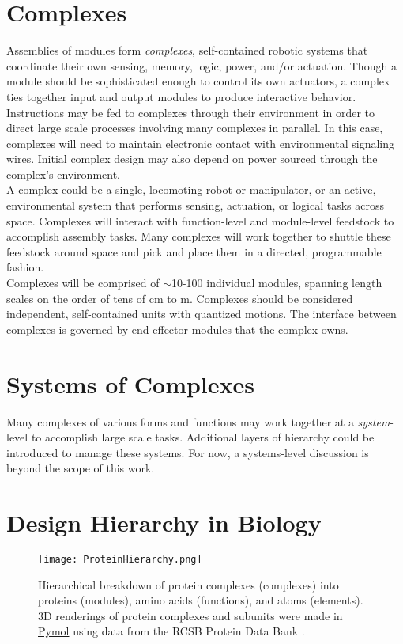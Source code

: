 {\section{Complexes}

Assemblies of modules form \textit{complexes}, self-contained robotic systems that coordinate their own sensing, memory, logic, power, and/or actuation.  Though a module should be sophisticated enough to control its own actuators, a complex ties together input and output modules to produce interactive behavior.  Instructions may be fed to complexes through their environment in order to direct large scale processes involving many complexes in parallel.  In this case, complexes will need to maintain electronic contact with environmental signaling wires.  Initial complex design may also depend on power sourced through the complex's environment.\\

A complex could be a single, locomoting robot or manipulator, or an active, environmental system that performs sensing, actuation, or logical tasks across space.  Complexes will interact with function-level and module-level feedstock to accomplish assembly tasks.  Many complexes will work together to shuttle these feedstock around space and pick and place them in a directed, programmable fashion.\\

Complexes will be comprised of $\sim$10-100 individual modules, spanning length scales on the order of tens of cm to m.  Complexes should be considered independent, self-contained units with quantized motions.  The interface between complexes is governed by end effector modules that the complex owns.

\section{Systems of Complexes}

Many complexes of various forms and functions may work together at a \textit{system}-level to accomplish large scale tasks.  Additional layers of hierarchy could be introduced to manage these systems.  For now, a systems-level discussion is beyond the scope of this work.

\section{Design Hierarchy in Biology}\label{sec:biologyHierarchy}

\begin{sidewaysfigure}
  \texttt{[image: ProteinHierarchy.png]}
  \caption{Hierarchical breakdown of protein complexes (complexes) into proteins (modules), amino acids (functions), and atoms (elements).  3D renderings of protein complexes and subunits were made in \href{https://www.pymol.org/}{Pymol} using data from the RCSB Protein Data Bank  \cite{UCSD/SDSC}.}
  \label{fig:ProteinHierarchy}
\end{sidewaysfigure}


}
